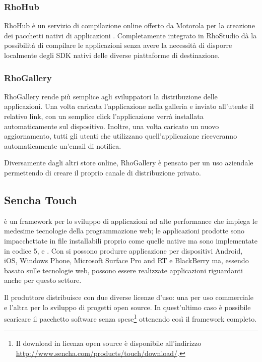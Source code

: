             \subsubsection{RhoHub}
                RhoHub è un servizio di compilazione online offerto da Motorola
                per la creazione dei pacchetti nativi di applicazioni \rhom{}.
                Completamente integrato in RhoStudio dà la possibilità di
                compilare le applicazioni senza avere la necessità di disporre
                localmente degli SDK nativi delle diverse piattaforme di
                destinazione.
            \subsubsection{RhoGallery}
                RhoGallery rende più semplice agli sviluppatori la distribuzione
                delle applicazioni. Una volta caricata l'applicazione nella
                galleria e inviato all'utente il relativo link, con un semplice
                click l'applicazione verrà installata automaticamente sul
                dispositivo. Inoltre, una volta caricato un nuovo aggiornamento,
                tutti gli utenti che utilizzano quell'applicazione riceveranno
                automaticamente un'email di notifica.

                Diversamente dagli altri store online, RhoGallery è
                pensato per un uso aziendale permettendo di creare il proprio
                canale di distribuzione privato.


        \subsection{Sencha Touch}
            \senchat{} è un frame\-work per lo sviluppo \crossplat{} di
            applicazioni ad alte performance che impiega le medesime tecnologie
            della programmazione web; le applicazioni prodotte sono
            impacchettate in file installabili proprio come quelle native ma
            sono implementate in codice \html{}5, \css{} e \js{}. Con \senchat{}
            si possono produrre applicazione per dispositivi Android, iOS,
            Windows Phone, Microsoft Surface Pro and RT e BlackBerry ma, essendo
            basato sulle tecnologie web, possono essere realizzate applicazioni
            riguardanti anche per questo settore.

            Il produttore distribuisce \senchat{} con due diverse licenze d'uso:
            una per uso commerciale e l'altra per lo sviluppo di progetti open
            \mbox{source}. In quest'ultimo caso è possibile scaricare il pacchetto
            software senza spese\footnote{Il download in licenza open \mbox{source} è
            disponibile all'indirizzo \url{http://www.sencha.com/products/touch/download/}.}
            ottenendo così il frame\-work completo.


